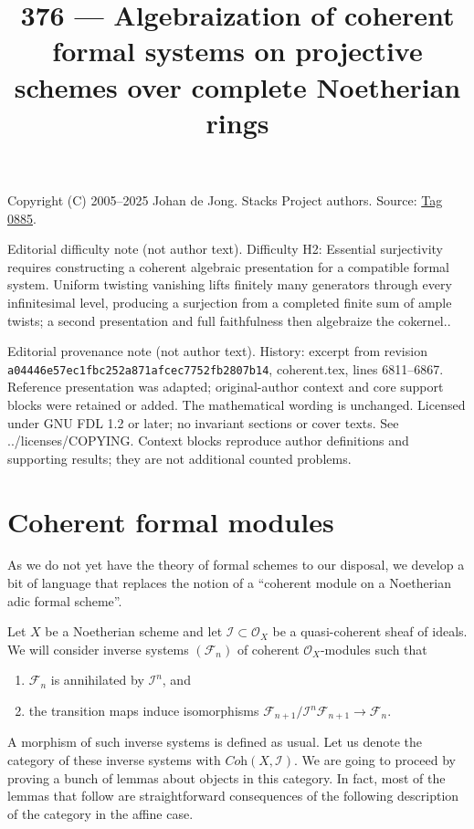 \documentclass{amsart}
\theoremstyle{plain}
\theoremstyle{definition}
\theoremstyle{remark}
\numberwithin{equation}{subsection}
\begin{document}
\title[Stacks Project, Tag 0885]{376 --- Algebraization of coherent formal systems on projective schemes over complete Noetherian rings}
\maketitle
\noindent Copyright (C) 2005--2025 Johan de Jong. Stacks Project authors. Source: \href{https://stacks.math.columbia.edu/tag/0885}{Tag 0885}.

\noindent Editorial difficulty note (not author text). Difficulty H2: Essential surjectivity requires constructing a coherent algebraic presentation for a compatible formal system. Uniform twisting vanishing lifts finitely many generators through every infinitesimal level, producing a surjection from a completed finite sum of ample twists; a second presentation and full faithfulness then algebraize the cokernel..

\noindent Editorial provenance note (not author text). History: excerpt from revision \texttt{a0444\allowbreak 6e57e\allowbreak c1fbc\allowbreak 252a8\allowbreak 71afc\allowbreak ec775\allowbreak 2fb28\allowbreak 07b14}, coherent.tex, lines 6811--6867. Reference presentation was adapted; original-author context and core support blocks were retained or added. The mathematical wording is unchanged. Licensed under GNU FDL 1.2 or later; no invariant sections or cover texts. See ../licenses/COPYING. Context blocks reproduce author definitions and supporting results; they are not additional counted problems.

\section{Coherent formal modules}
\label{section-coherent-formal}

\noindent
As we do not yet have the theory of formal schemes to our disposal, we
develop a bit of language that replaces the notion of a ``coherent module on a
Noetherian adic formal scheme''.

\medskip\noindent
Let $X$ be a Noetherian scheme and let $\mathcal{I} \subset \mathcal{O}_X$
be a quasi-coherent sheaf of ideals. We will consider inverse
systems $(\mathcal{F}_n)$ of coherent $\mathcal{O}_X$-modules such that
\begin{enumerate}
\item $\mathcal{F}_n$ is annihilated by $\mathcal{I}^n$, and
\item the transition maps induce isomorphisms
$\mathcal{F}_{n + 1}/\mathcal{I}^n\mathcal{F}_{n + 1} \to \mathcal{F}_n$.
\end{enumerate}
A morphism of such inverse systems is defined as usual.
Let us denote the category of these inverse systems with
$\textit{Coh}(X, \mathcal{I})$. We are going to proceed by proving
a bunch of lemmas about objects in this category. In fact, most
of the lemmas that follow are straightforward consequences of the following
description of the category in the affine case.
\end{document}
